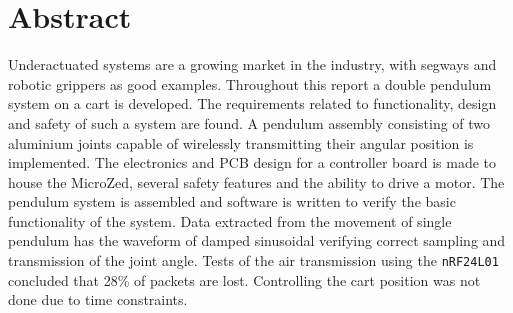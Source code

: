 \section*{Abstract}

Underactuated systems are a growing market in the industry, with segways and robotic grippers as good examples.
Throughout this report a double pendulum system on a cart is developed.
The requirements related to functionality, design and safety of such a system are found.
A pendulum assembly consisting of two aluminium joints capable of wirelessly transmitting their angular position is implemented.
The electronics and PCB design for a controller board is made to house the MicroZed, several safety features and the ability to drive a motor.
The pendulum system is assembled and software is written to verify the basic functionality of the system.
Data extracted from the movement of single pendulum has the waveform of damped sinusoidal verifying correct sampling and transmission of the joint angle.
Tests of the air transmission using the \texttt{nRF24L01} concluded that 28\% of packets are lost.
Controlling the cart position was not done due to time constraints.